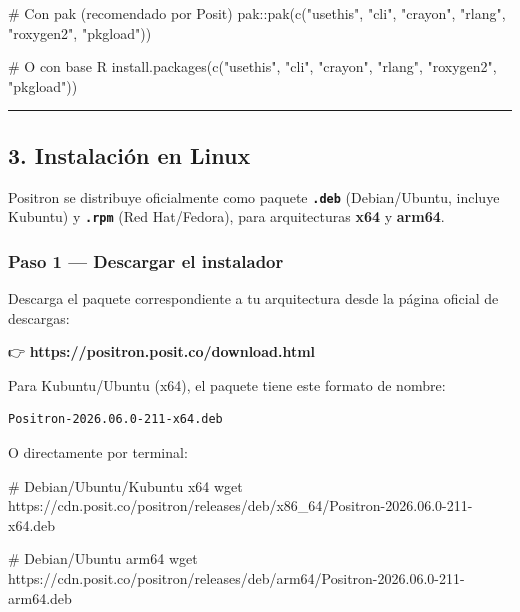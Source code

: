 \documentclass[
  doc,
  floatsintext,
  longtable,
  a4paper,
  nolmodern,
  notxfonts,
  notimes,
  12pt,
  colorlinks=true,linkcolor=blue,citecolor=blue,urlcolor=blue]{apa7}
\newenvironment{Shaded}{\begin{snugshade}}{\end{snugshade}}
\newcommand{\CommentTok}[1]{\textcolor[rgb]{0.37,0.37,0.37}{#1}}
\newcommand{\FunctionTok}[1]{\textcolor[rgb]{0.28,0.35,0.67}{#1}}
\newcommand{\NormalTok}[1]{\textcolor[rgb]{0.00,0.23,0.31}{#1}}
\newcommand{\SpecialCharTok}[1]{\textcolor[rgb]{0.37,0.37,0.37}{#1}}
\newcommand{\StringTok}[1]{\textcolor[rgb]{0.13,0.47,0.30}{#1}}
\begin{document}
\begin{Shaded}
\begin{Highlighting}[]
\CommentTok{\# Con pak (recomendado por Posit)}
\NormalTok{pak}\SpecialCharTok{::}\FunctionTok{pak}\NormalTok{(}\FunctionTok{c}\NormalTok{(}\StringTok{"usethis"}\NormalTok{, }\StringTok{"cli"}\NormalTok{, }\StringTok{"crayon"}\NormalTok{, }\StringTok{"rlang"}\NormalTok{, }\StringTok{"roxygen2"}\NormalTok{, }\StringTok{"pkgload"}\NormalTok{))}

\CommentTok{\# O con base R}
\FunctionTok{install.packages}\NormalTok{(}\FunctionTok{c}\NormalTok{(}\StringTok{"usethis"}\NormalTok{, }\StringTok{"cli"}\NormalTok{, }\StringTok{"crayon"}\NormalTok{, }\StringTok{"rlang"}\NormalTok{, }\StringTok{"roxygen2"}\NormalTok{, }\StringTok{"pkgload"}\NormalTok{))}
\end{Highlighting}
\end{Shaded}

\begin{center}\rule{0.5\linewidth}{0.5pt}\end{center}

\subsection{3. Instalación en Linux}\label{instalaciuxf3n-en-linux}

Positron se distribuye oficialmente como paquete \textbf{\texttt{.deb}}
(Debian/Ubuntu, incluye Kubuntu) y \textbf{\texttt{.rpm}} (Red
Hat/Fedora), para arquitecturas \textbf{x64} y \textbf{arm64}.

\subsubsection{Paso 1 --- Descargar el
instalador}\label{paso-1-descargar-el-instalador}

Descarga el paquete correspondiente a tu arquitectura desde la página
oficial de descargas:

👉 \textbf{https://positron.posit.co/download.html}

Para Kubuntu/Ubuntu (x64), el paquete tiene este formato de nombre:

\begin{verbatim}
Positron-2026.06.0-211-x64.deb
\end{verbatim}

O directamente por terminal:

\begin{Shaded}
\begin{Highlighting}[]
\CommentTok{\# Debian/Ubuntu/Kubuntu x64}
\FunctionTok{wget}\NormalTok{ https://cdn.posit.co/positron/releases/deb/x86\_64/Positron{-}2026.06.0{-}211{-}x64.deb}

\CommentTok{\# Debian/Ubuntu arm64}
\FunctionTok{wget}\NormalTok{ https://cdn.posit.co/positron/releases/deb/arm64/Positron{-}2026.06.0{-}211{-}arm64.deb}
\end{Highlighting}
\end{Shaded}
\end{document}
